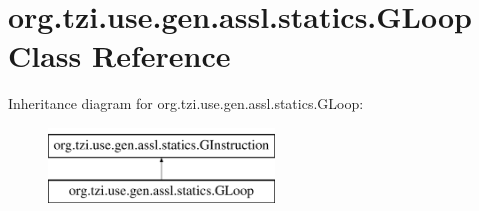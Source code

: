 \hypertarget{classorg_1_1tzi_1_1use_1_1gen_1_1assl_1_1statics_1_1_g_loop}{\section{org.\-tzi.\-use.\-gen.\-assl.\-statics.\-G\-Loop Class Reference}
\label{classorg_1_1tzi_1_1use_1_1gen_1_1assl_1_1statics_1_1_g_loop}
}
Inheritance diagram for org.\-tzi.\-use.\-gen.\-assl.\-statics.\-G\-Loop\-:\begin{figure}[H]
\begin{center}
\leavevmode
\includegraphics[height=2.000000cm]{classorg_1_1tzi_1_1use_1_1gen_1_1assl_1_1statics_1_1_g_loop}
\end{center}
\end{figure}
